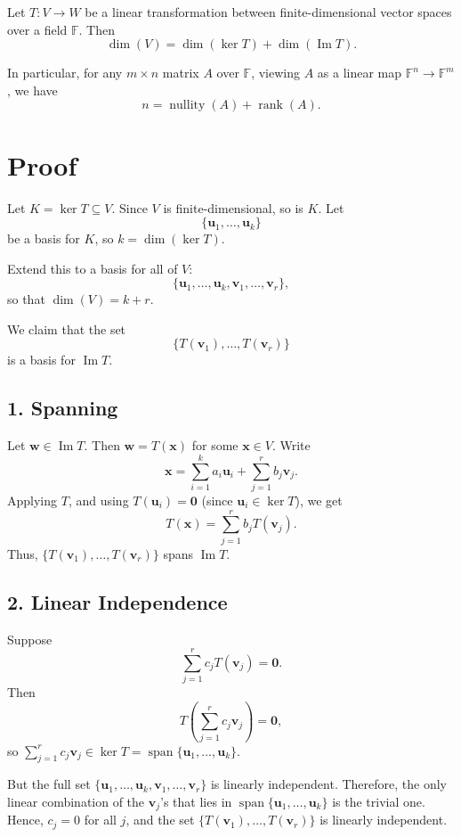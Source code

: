 \documentclass[11pt]{article}
\begin{document}
Let $ T: V \to W $ be a linear transformation between finite-dimensional vector spaces over a field $ \mathbb{F} $. Then
\[
\dim(V) = \dim(\ker T) + \dim(\operatorname{Im} T).
\]

In particular, for any $ m \times n $ matrix $ A $ over $ \mathbb{F} $, viewing $ A $ as a linear map $ \mathbb{F}^n \to \mathbb{F}^m $, we have
\[
n = \operatorname{nullity}(A) + \operatorname{rank}(A).
\]

\section*{Proof}

Let $ K = \ker T \subseteq V $. Since $ V $ is finite-dimensional, so is $ K $. Let
\[
\{ \mathbf{u}_1, \dots, \mathbf{u}_k \}
\]
be a basis for $ K $, so $ k = \dim(\ker T) $.

Extend this to a basis for all of $ V $:
\[
\{ \mathbf{u}_1, \dots, \mathbf{u}_k, \mathbf{v}_1, \dots, \mathbf{v}_r \},
\]
so that $ \dim(V) = k + r $.

We claim that the set
\[
\{ T(\mathbf{v}_1), \dots, T(\mathbf{v}_r) \}
\]
is a basis for $ \operatorname{Im} T $.

\subsection*{1. Spanning}

Let $ \mathbf{w} \in \operatorname{Im} T $. Then $ \mathbf{w} = T(\mathbf{x}) $ for some $ \mathbf{x} \in V $. Write
\[
\mathbf{x} = \sum_{i=1}^k a_i \mathbf{u}_i + \sum_{j=1}^r b_j \mathbf{v}_j.
\]
Applying $ T $, and using $ T(\mathbf{u}_i) = \mathbf{0} $ (since $ \mathbf{u}_i \in \ker T $), we get
\[
T(\mathbf{x}) = \sum_{j=1}^r b_j T(\mathbf{v}_j).
\]
Thus, $ \{ T(\mathbf{v}_1), \dots, T(\mathbf{v}_r) \} $ spans $ \operatorname{Im} T $.

\subsection*{2. Linear Independence}

Suppose
\[
\sum_{j=1}^r c_j T(\mathbf{v}_j) = \mathbf{0}.
\]
Then
\[
T\left( \sum_{j=1}^r c_j \mathbf{v}_j \right) = \mathbf{0},
\]
so $ \sum_{j=1}^r c_j \mathbf{v}_j \in \ker T = \operatorname{span}\{ \mathbf{u}_1, \dots, \mathbf{u}_k \} $.

But the full set $ \{ \mathbf{u}_1, \dots, \mathbf{u}_k, \mathbf{v}_1, \dots, \mathbf{v}_r \} $ is linearly independent.  
Therefore, the only linear combination of the $ \mathbf{v}_j $'s that lies in $ \operatorname{span}\{ \mathbf{u}_1, \dots, \mathbf{u}_k \} $ is the trivial one.  
Hence, $ c_j = 0 $ for all $ j $, and the set $ \{ T(\mathbf{v}_1), \dots, T(\mathbf{v}_r) \} $ is linearly independent.
\end{document}
